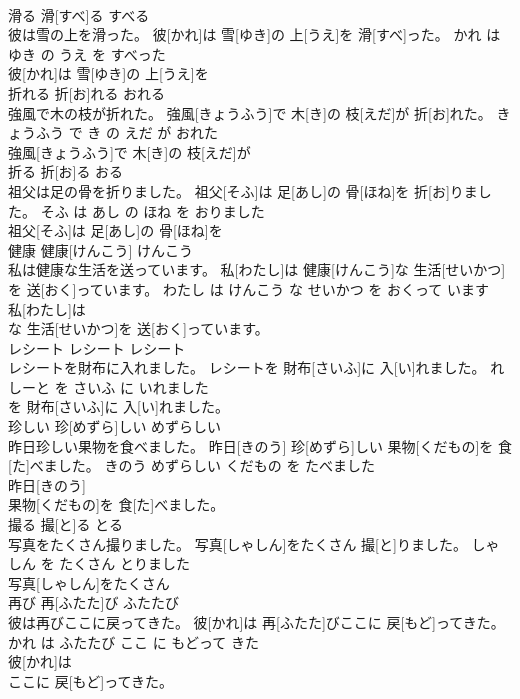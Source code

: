 \documentclass[8pt]{extreport}
\begin{document}
\begin{CJK}{UTF8}{min}
\\	滑る	滑[すべ]る	すべる	
\\	彼は雪の上を滑った。	彼[かれ]は 雪[ゆき]の 上[うえ]を 滑[すべ]った。	かれ は ゆき の うえ を すべった	
\\	彼[かれ]は 雪[ゆき]の 上[うえ]を
\\	折れる	折[お]れる	おれる	
\\	強風で木の枝が折れた。	強風[きょうふう]で 木[き]の 枝[えだ]が 折[お]れた。	きょうふう で き の えだ が おれた	
\\	強風[きょうふう]で 木[き]の 枝[えだ]が
\\	折る	折[お]る	おる	
\\	祖父は足の骨を折りました。	祖父[そふ]は 足[あし]の 骨[ほね]を 折[お]りました。	そふ は あし の ほね を おりました	
\\	祖父[そふ]は 足[あし]の 骨[ほね]を
\\	健康	健康[けんこう]	けんこう	
\\	私は健康な生活を送っています。	私[わたし]は 健康[けんこう]な 生活[せいかつ]を 送[おく]っています。	わたし は けんこう な せいかつ を おくって います	
\\	私[わたし]は
\\	な 生活[せいかつ]を 送[おく]っています。		
\\	レシート	レシート	レシート	
\\	レシートを財布に入れました。	レシートを 財布[さいふ]に 入[い]れました。	れしーと を さいふ に いれました	
\\	を 財布[さいふ]に 入[い]れました。		
\\	珍しい	珍[めずら]しい	めずらしい	
\\	昨日珍しい果物を食べました。	昨日[きのう] 珍[めずら]しい 果物[くだもの]を 食[た]べました。	きのう めずらしい くだもの を たべました	
\\	昨日[きのう]
\\	果物[くだもの]を 食[た]べました。		
\\	撮る	撮[と]る	とる	
\\	写真をたくさん撮りました。	写真[しゃしん]をたくさん 撮[と]りました。	しゃしん を たくさん とりました	
\\	写真[しゃしん]をたくさん
\\	再び	再[ふたた]び	ふたたび	
\\	彼は再びここに戻ってきた。	彼[かれ]は 再[ふたた]びここに 戻[もど]ってきた。	かれ は ふたたび ここ に もどって きた	
\\	彼[かれ]は
\\	ここに 戻[もど]ってきた。		

\end{CJK}
\end{document}
